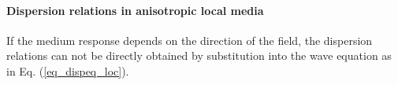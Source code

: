 \paragraph{Dispersion relations in anisotropic local media}  %
If the medium response depends on the direction of the field, the dispersion relations can not be directly obtained by substitution into the wave equation as in Eq. (\ref{eq_dispeq_loc}).
